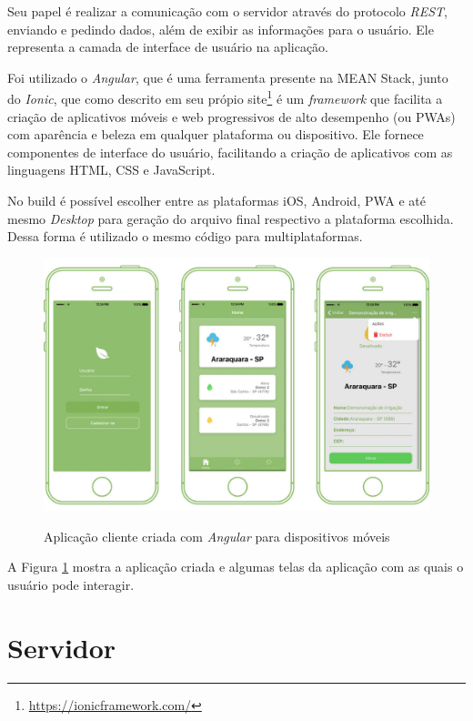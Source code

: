 \documentclass[
	12pt,				%
	openright,			%
	twoside,			%
	a4paper,			%
	english,			%
	brazil				%
	]{abntex2}
\begin{document}
Seu papel é realizar a comunicação com o servidor através do protocolo \textit{REST}, enviando e pedindo dados, além de exibir as informações para o usuário. Ele representa a camada de interface de usuário na aplicação.

Foi utilizado o \textit{Angular}, que é uma ferramenta presente na MEAN Stack, junto do \textit{Ionic}, que como descrito em seu própio site\footnote{\url{https://ionicframework.com/}} é um \textit{framework} que facilita a criação de aplicativos móveis e web progressivos de alto desempenho (ou PWAs) com aparência e beleza em qualquer plataforma ou dispositivo. Ele fornece componentes de interface do usuário, facilitando a criação de aplicativos com as linguagens HTML, CSS e JavaScript.

No build é possível escolher entre as plataformas iOS, Android, PWA e até mesmo \textit{Desktop} para geração do arquivo final respectivo a plataforma escolhida. Dessa forma é utilizado o mesmo código para multiplataformas.

\begin{figure}[h]
	\centering

	\caption{Aplicação cliente criada com \textit{Angular} para dispositivos móveis} \label{fig:ClientAppExample}
    \includegraphics[scale=0.35]{client-app} \\

\end{figure}

A Figura \ref{fig:ClientAppExample} mostra a aplicação criada e algumas telas da aplicação com as quais o usuário pode interagir.

\section{Servidor}
\end{document}
